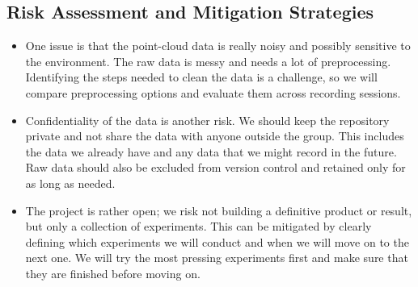 \subsection{Risk Assessment and Mitigation Strategies}
\begin{itemize}
    \item One issue is that the point-cloud data is really noisy and possibly sensitive to the environment. The raw data is messy and needs a lot of preprocessing. Identifying the steps needed to clean the data is a challenge, so we will compare preprocessing options and evaluate them across recording sessions.
    \item Confidentiality of the data is another risk. We should keep the repository private and not share the data with anyone outside the group. This includes the data we already have and any data that we might record in the future. Raw data should also be excluded from version control and retained only for as long as needed.
    \item The project is rather open; we risk not building a definitive product or result, but only a collection of experiments. This can be mitigated by clearly defining which experiments we will conduct and when we will move on to the next one. We will try the most pressing experiments first and make sure that they are finished before moving on.
\end{itemize}
